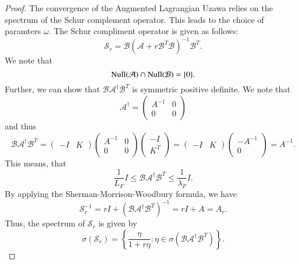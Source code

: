 \documentclass{article}
\theoremstyle{definition}
\begin{document}
\begin{proof}
The convergence of the Augmented Lagrangian Uzawa relies on the spectrum of the Schur complement operator. This leads to the choice of paramters $\omega$. The Schur compliment operator is given as follows: 
\begin{equation}
\mathcal{S}_r = \mathcal{B}( \mathcal{A} + r \mathcal{B}^T \mathcal{B})^{-1} \mathcal{B}^T. 
\end{equation} 
We note that 
\begin{equation}
{\rm Null}(\mathcal{A}) \cap {\rm Null}(\mathcal{B}) = \{ 0\}. 
\end{equation}
Further, we can show that $\mathcal{B} \mathcal{A}^\dag \mathcal{B}^T$ is symmetric positive definite. We note that 
\begin{equation}
\mathcal{A}^\dag = \begin{pmatrix} A^{-1} & 0 \\ 0 & 0 \end{pmatrix} 
\end{equation} 
and thus 
\begin{equation}
\mathcal{B}\mathcal{A}^\dag \mathcal{B}^T = \begin{pmatrix} -I & K \end{pmatrix}  \begin{pmatrix} A^{-1} & 0 \\ 0 & 0 \end{pmatrix} \begin{pmatrix} -I \\ K^T \end{pmatrix} = \begin{pmatrix} -I & K \end{pmatrix} \begin{pmatrix} -A^{-1} \\ 0 \end{pmatrix} = A^{-1}.
\end{equation} 
This means, that 
\begin{equation}
\frac{1}{L_F} I \leq \mathcal{B} \mathcal{A}^\dag \mathcal{B}^T \leq \frac{1}{\lambda_F} I.   
\end{equation} 
By applying the Sherman-Morrison-Woodbury formula, we have  
\begin{equation}
\mathcal{S}_r^{-1} = rI + (\mathcal{B} \mathcal{A}^\dag \mathcal{B}^T)^{-1} = rI + A = A_r.    
\end{equation}
Thus, the spectrum of $\mathcal{S}_r$ is given by 
\begin{equation}
\sigma(\mathcal{S}_r) = \left \{\frac{\eta}{1 + r \eta} : \eta \in \sigma(\mathcal{B}\mathcal{A}^\dag \mathcal{B}^T) \right \}.

\end{equation}
\end{proof}
\end{document}
